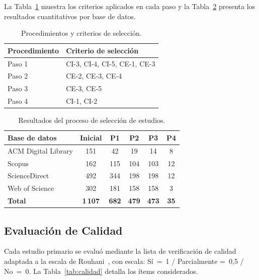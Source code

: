 \documentclass[12pt, a4paper]{article}
\begin{document}
La Tabla~\ref{tab:pasos} muestra los criterios aplicados en cada paso
y la Tabla~\ref{tab:seleccion} presenta los resultados cuantitativos
por base de datos.

\begin{table}[H]
\centering
\caption{Procedimientos y criterios de selecci\'{o}n.}
\label{tab:pasos}
\begin{tabularx}{\linewidth}{lX}
\toprule
\textbf{Procedimiento} & \textbf{Criterio de selecci\'{o}n} \\
\midrule
Paso 1 & CI-3, CI-4, CI-5, CE-1, CE-3 \\
Paso 2 & CE-2, CE-3, CE-4 \\
Paso 3 & CE-3, CE-5 \\
Paso 4 & CI-1, CI-2 \\
\bottomrule
\end{tabularx}
\end{table}

\begin{table}[H]
\centering
\caption{Resultados del proceso de selecci\'{o}n de estudios.}
\label{tab:seleccion}
\begin{tabularx}{\linewidth}{Xccccc}
\toprule
\textbf{Base de datos} & \textbf{Inicial} &
\textbf{P1} & \textbf{P2} & \textbf{P3} & \textbf{P4} \\
\midrule
ACM Digital Library & 151 & 42 & 19 & 14 &  8 \\
Scopus              & 162 & 115 & 104 & 103 & 12 \\
ScienceDirect       & 492 & 344 & 198 & 198 & 12 \\
Web of Science      & 302 & 181 & 158 & 158 &  3 \\
\midrule
\textbf{Total} & \textbf{1\,107} & \textbf{682} &
\textbf{479} & \textbf{473} & \textbf{35} \\
\bottomrule
\end{tabularx}
\end{table}

\subsection{Evaluaci\'{o}n de Calidad}

Cada estudio primario se evalu\'{o} mediante la lista de
verificaci\'{o}n de calidad adaptada a la escala de
Rouhani~\cite{Kitchenham2013}, con escala: S\'{i}~=~1 / Parcialmente
=~0{,}5 / No~=~0. La Tabla~\ref{tab:calidad} detalla los \'{i}tems
considerados.
\end{document}
